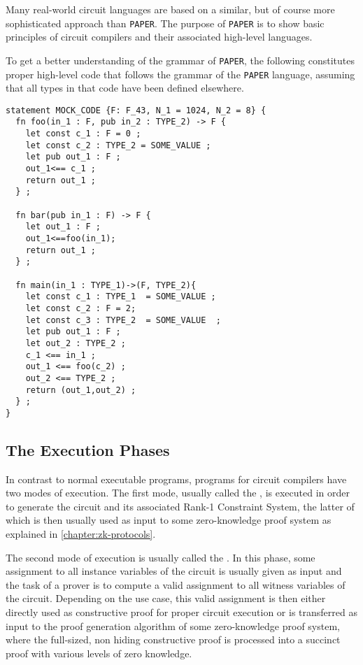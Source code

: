 Many real-world circuit languages are based on a similar, but of course more sophisticated approach than \texttt{PAPER}. The purpose of \texttt{PAPER} is to show basic principles of circuit compilers and their associated high-level languages.
\begin{example}To get a better understanding of the grammar of \texttt{PAPER}, the following constitutes proper high-level code that follows the grammar of the \texttt{PAPER} language, assuming that all types in that code have been defined elsewhere. 
\begin{lstlisting}
statement MOCK_CODE {F: F_43, N_1 = 1024, N_2 = 8} {
  fn foo(in_1 : F, pub in_2 : TYPE_2) -> F {
    let const c_1 : F = 0 ;
    let const c_2 : TYPE_2 = SOME_VALUE ;
    let pub out_1 : F ;
    out_1<== c_1 ;
    return out_1 ;
  } ;
  
  fn bar(pub in_1 : F) -> F {
    let out_1 : F ;
    out_1<==foo(in_1);
    return out_1 ;
  } ;
    
  fn main(in_1 : TYPE_1)->(F, TYPE_2){
    let const c_1 : TYPE_1  = SOME_VALUE ;
    let const c_2 : F = 2;
    let const c_3 : TYPE_2  = SOME_VALUE  ;
    let pub out_1 : F ;
    let out_2 : TYPE_2 ;
    c_1 <== in_1 ;
    out_1 <== foo(c_2) ;
    out_2 <== TYPE_2 ;
    return (out_1,out_2) ;
  } ;
}
\end{lstlisting}
\end{example}
\subsection{The Execution Phases} In contrast to normal executable programs, programs for circuit compilers have two modes of execution. The first mode, usually called the  , is executed in order to generate the circuit and its associated Rank-1 Constraint System, the latter of which is then usually used as input to some zero-knowledge proof system as explained in \ref{chapter:zk-protocols}.

The second mode of execution is usually called the . In this phase, some assignment to all instance variables of the circuit is usually given as input and the task of a prover is to compute a valid assignment to all witness variables of the circuit. Depending on the use case, this valid assignment is then either directly used as constructive proof for proper circuit execution or is transferred as input to the proof generation algorithm of some zero-knowledge proof system, where the full-sized, non hiding constructive proof is processed into a succinct proof with various levels of zero knowledge.

